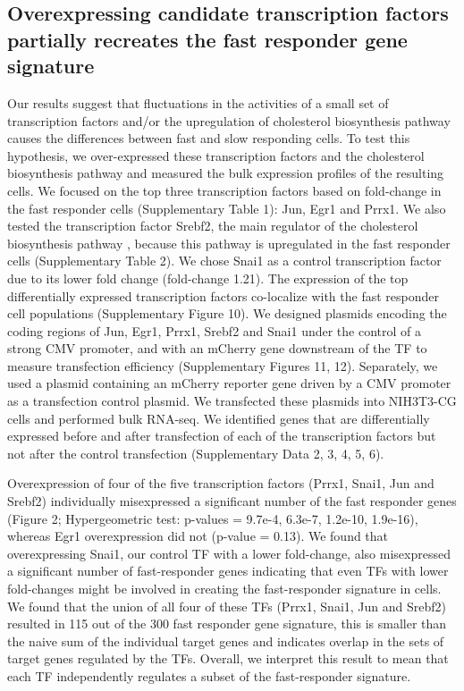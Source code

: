 \subsection{Overexpressing candidate transcription factors partially recreates the fast responder gene signature}

Our results suggest that fluctuations in the activities of a small set of transcription factors and/or the upregulation of cholesterol biosynthesis pathway causes the differences between fast and slow responding cells. To test this hypothesis, we over-expressed these transcription factors and the cholesterol biosynthesis pathway and measured the bulk expression profiles of the resulting cells. We focused on the top three transcription factors based on fold-change in the fast responder cells (Supplementary Table 1): Jun, Egr1 and Prrx1. We also tested the transcription factor Srebf2, the main regulator of the cholesterol biosynthesis pathway \cite{Horton1998-lj}, because this pathway is upregulated in the fast responder cells (Supplementary Table 2). We chose Snai1 as a control transcription factor due to its lower fold change (fold-change 1.21). The expression of the top differentially expressed transcription factors co-localize with the fast responder cell populations (Supplementary Figure 10). We designed plasmids encoding the coding regions of Jun, Egr1, Prrx1, Srebf2 and Snai1 under the control of a strong CMV promoter, and with an mCherry gene downstream of the TF to measure transfection efficiency (Supplementary Figures 11, 12). Separately, we used a plasmid containing an mCherry reporter gene driven by a CMV promoter as a transfection control plasmid. We transfected these plasmids into NIH3T3-CG cells and performed bulk RNA-seq. We identified genes that are differentially expressed before and after transfection of each of the transcription factors but not after the control transfection (Supplementary Data 2, 3, 4, 5, 6).

Overexpression of four of the five transcription factors (Prrx1, Snai1, Jun and Srebf2) individually misexpressed a significant number of the fast responder genes (Figure 2; Hypergeometric test: p-values = 9.7e-4, 6.3e-7, 1.2e-10, 1.9e-16), whereas Egr1 overexpression did not (p-value = 0.13). We found that overexpressing Snai1, our control TF with a lower fold-change, also misexpressed a significant number of fast-responder genes indicating that even TFs with lower fold-changes might be involved in creating the fast-responder signature in cells. We found that the union of all four of these TFs (Prrx1, Snai1, Jun and Srebf2) resulted in 115 out of the 300 fast responder gene signature, this is smaller than the naive sum of the individual target genes and indicates overlap in the sets of target genes regulated by the TFs. Overall, we interpret this result to mean that each TF independently regulates a subset of the fast-responder signature.

